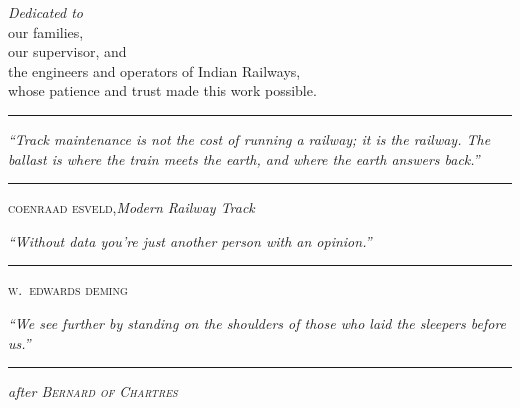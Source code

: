 \thispagestyle{empty}
\vspace*{6cm}
\begin{center}
{\Large\itshape\color{gsvblue} Dedicated to}\\[0.7cm]
{\large our families,}\\[0.25cm]
{\large our supervisor, and}\\[0.25cm]
{\large the engineers and operators of Indian Railways,}\\[0.7cm]
{\large whose patience and trust made this work possible.}\\[1.5cm]
{\color{gsvaccent}\rule{0.18\textwidth}{0.4pt}}
\end{center}
\vspace*{\fill}
\cleardoublepage

\thispagestyle{empty}
\null\vfill
\begin{center}
\begin{minipage}{0.74\textwidth}
\itshape\large\color{gsvblue!90!black}
``Track maintenance is not the cost of running a railway; it \emph{is}
the railway. The ballast is where the train meets the earth, and where
the earth answers back.''\par
\vspace{12pt}
{\hfill\upshape\normalsize\color{gsvblue}\rule{0.6em}{0.4pt}\;
\textsc{coenraad esveld},\;\itshape Modern Railway Track\hfill}\par
\end{minipage}

\vspace{1.8cm}

\begin{minipage}{0.74\textwidth}
\itshape\large\color{gsvblue!90!black}
``Without data you're just another person with an opinion.''\par
\vspace{12pt}
{\hfill\upshape\normalsize\color{gsvblue}\rule{0.6em}{0.4pt}\;
\textsc{w.\ edwards deming}\hfill}\par
\end{minipage}

\vspace{1.8cm}

\begin{minipage}{0.74\textwidth}
\itshape\large\color{gsvblue!90!black}
``We see further by standing on the shoulders of those who laid the
sleepers before us.''\par
\vspace{12pt}
{\hfill\upshape\normalsize\color{gsvblue}\rule{0.6em}{0.4pt}\;
\itshape{after \textsc{Bernard of Chartres}}\hfill}\par
\end{minipage}
\end{center}
\vfill
\null
\cleardoublepage
